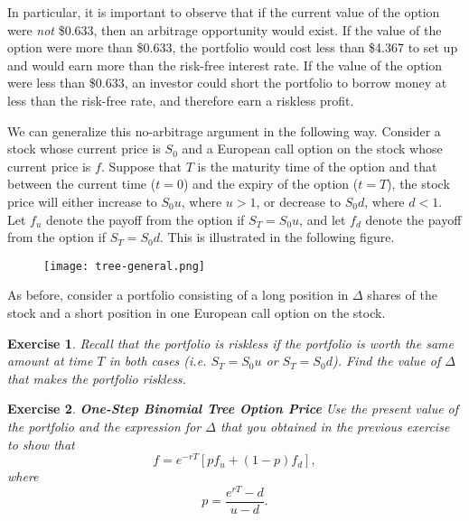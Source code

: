 \documentclass[letterpaper,10pt]{article}
\newtheorem{ex}{Exercise}
\begin{document}
\noindent In particular, it is important to observe that if the current value of the option were {\em not} \$0.633, then an arbitrage opportunity would exist.  If the value of the option were more than \$0.633, the portfolio would cost less than \$4.367 to set up and would earn more than the risk-free interest rate.  If the value of the option were less than \$0.633, an investor could short the portfolio to borrow money at less than the risk-free rate, and therefore earn a riskless profit.

\smallskip

We can generalize this no-arbitrage argument in the following way.  Consider a stock whose current price is $S_0$ and a European call option on the stock whose current price is $f$.  Suppose that $T$ is the maturity time of the option and that between the current time ($t=0$) and the expiry of the option ($t=T$), the stock price will either increase to $S_0u$, where $u>1$, or decrease to $S_0d$, where $d<1$.  Let $f_u$ denote the payoff from the option if $S_T=S_0u$, and let $f_d$ denote the payoff from the option if $S_T=S_0d$.  This is illustrated in the following figure.

\begin{center}
\begin{figure}[H]
\texttt{[image: tree-general.png]}
\end{figure}
\end{center}

As before, consider a portfolio consisting of a long position in $\Delta$ shares of the stock and a short position in one European call option on the stock.

\begin{ex}
Recall that the portfolio is riskless if the portfolio is worth the same amount at time $T$ in both cases (i.e. $S_T=S_0u$ or $S_T=S_0d$).  Find the value of $\Delta$ that makes the portfolio riskless.
\end{ex}

\begin{ex}\label{option-price}{\bf One-Step Binomial Tree Option Price}
Use the present value of the portfolio and the expression for $\Delta$ that you obtained in the previous exercise to show that $$f=e^{-rT}\left[pf_u+(1-p)f_d\right],$$ where $$p=\frac{e^{rT}-d}{u-d}.$$
\end{ex}
\end{document}
